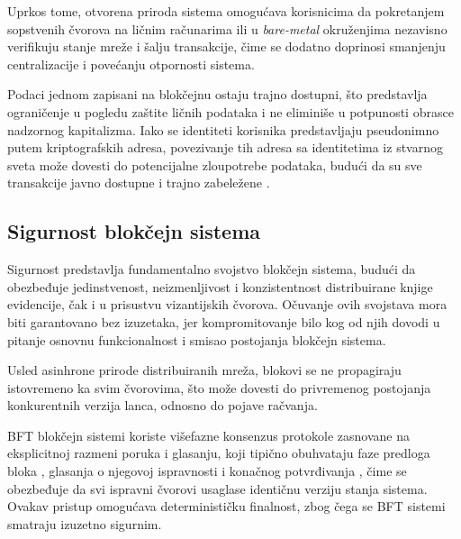 Uprkos tome, otvorena priroda sistema omogućava korisnicima da pokretanjem sopstvenih čvorova na ličnim računarima ili u \textit{bare-metal} okruženjima nezavisno verifikuju stanje mreže i šalju transakcije, čime se dodatno doprinosi smanjenju centralizacije i povećanju otpornosti sistema.

Podaci jednom zapisani na blokčejnu ostaju trajno dostupni, što predstavlja ograničenje u pogledu zaštite ličnih podataka i ne eliminiše u potpunosti obrasce nadzornog kapitalizma. Iako se identiteti korisnika predstavljaju pseudonimno putem kriptografskih adresa, povezivanje tih adresa sa identitetima iz stvarnog sveta može dovesti do potencijalne zloupotrebe podataka, budući da su sve transakcije javno dostupne i trajno zabeležene \cite{peng2021privacy}.

\subsection{Sigurnost blokčejn sistema}
Sigurnost predstavlja fundamentalno svojstvo blokčejn sistema, budući da obezbeđuje jedinstvenost, neizmenljivost i konzistentnost distribuirane knjige evidencije, čak i u prisustvu vizantijskih čvorova. Očuvanje ovih svojstava mora biti garantovano bez izuzetaka, jer kompromitovanje bilo kog od njih dovodi u pitanje osnovnu funkcionalnost i smisao postojanja blokčejn sistema.

Usled asinhrone prirode distribuiranih mreža, blokovi se ne propagiraju istovremeno ka svim čvorovima, što može dovesti do privremenog postojanja konkurentnih verzija lanca, odnosno do pojave račvanja.


BFT blokčejn sistemi koriste višefazne konsenzus protokole zasnovane na eksplicitnoj razmeni poruka i glasanju, koji tipično obuhvataju faze predloga bloka , glasanja o njegovoj ispravnosti  i konačnog potvrđivanja , čime se obezbeđuje da svi ispravni čvorovi usaglase identičnu verziju stanja sistema. Ovakav pristup omogućava determinističku finalnost, zbog čega se BFT sistemi smatraju izuzetno sigurnim.

